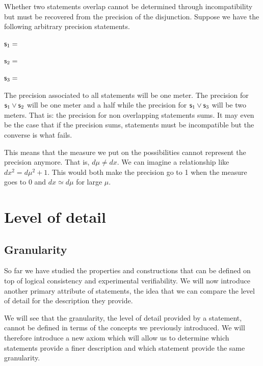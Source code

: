 \documentclass[11pt,letterpaper,fleqn]{memoir} %
\newif\ifdraft
\begin{document}
Whether two statements overlap cannot be determined through incompatibility but must be recovered from the precision of the disjunction. Suppose we have the following arbitrary precision statements.
\begin{description}
	\item $\mathsf{s}_1=$
	\item $\mathsf{s}_2=$
	\item $\mathsf{s}_3=$
\end{description}
The precision associated to all statements will be one meter. The precision for $\mathsf{s}_1\vee\mathsf{s}_2$ will be one meter and a half while the precision for $\mathsf{s}_1\vee\mathsf{s}_3$ will be two meters. That is: the precision for non overlapping statements sums. It may even be the case that if the precision sums, statements must be incompatible but the converse is what fails.

This means that the measure we put on the possibilities cannot represent the precision anymore. That is, $d\mu \neq dx$. We can imagine a relationship like $dx^2 = d\mu^2 + 1$. This would both make the precision go to 1 when the measure goes to 0 and $dx \simeq d\mu$ for large $\mu$.

\ifdraft

\fi

\iffalse

\chapter{Level of detail}

\section{Granularity}

So far we have studied the properties and constructions that can be defined on top of logical consistency and experimental verifiability. We will now  introduce another primary attribute of statements, the idea that we can compare the level of detail for the description they provide.

We will see that the granularity, the level of detail provided by a statement, cannot be defined in terms of the concepts we previously introduced. We will therefore introduce a new axiom which will allow us to determine which statements provide a finer description and which statement provide the same granularity.
\end{document}
